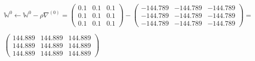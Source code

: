 \documentclass[12pt]{article}
\begin{document}
\indent $\mathbb{W}^{0} \leftarrow \mathbb{W}^{0} - \rho\nabla^{(0)} = 
\begin{pmatrix}
0.1 & 0.1 & 0.1\\
0.1 & 0.1 & 0.1\\
0.1 & 0.1 & 0.1
\end{pmatrix} - 
\begin{pmatrix}
-144.789 & -144.789 & -144.789 \\
-144.789 & -144.789 & -144.789 \\
-144.789 & -144.789 & -144.789 
\end{pmatrix} = $\\
\begin{center}$
\begin{pmatrix}
144.889 & 144.889 & 144.889 \\
144.889 & 144.889 & 144.889 \\
144.889 & 144.889 & 144.889 
\end{pmatrix}$
\end{center}


\noindent \hrulefill \\





\end{document}
